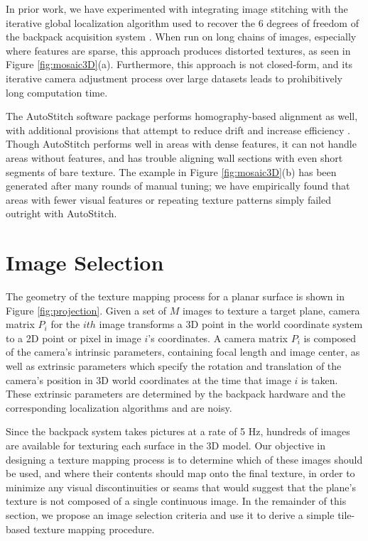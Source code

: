 \documentclass[]{spie}  %
\begin{document}
In prior work, we have experimented with integrating image stitching
with the iterative global localization algorithm used to recover the 6
degrees of freedom of the backpack acquisition system
\cite{liu2010indoor}. When run on long chains of images, especially
where features are sparse, this approach produces distorted textures,
as seen in Figure \ref{fig:mosaic3D}(a). Furthermore, this approach is
not closed-form, and its iterative camera adjustment process over
large datasets leads to prohibitively long computation time.

The AutoStitch software package performs homography-based alignment as
well, with additional provisions that attempt to reduce drift and
increase efficiency \cite{panorama2d, autostitch}. Though AutoStitch
performs well in areas with dense features, it can not handle areas
without features, and has trouble aligning wall sections with even
short segments of bare texture. The example in Figure
\ref{fig:mosaic3D}(b) has been generated after many rounds of manual
tuning; we have empirically found that areas with fewer visual
features or repeating texture patterns simply failed outright with
AutoStitch.

\section{Image Selection}
\label{sec:simpleTextureMapping}

The geometry of the texture mapping process for a planar surface is
shown in Figure \ref{fig:projection}. Given a set of $M$ images to
texture a target plane, camera matrix $P_i$ for the $ith$ image
transforms a 3D point in the world coordinate system to a 2D point or
pixel in image $i$'s coordinates. A camera matrix $P_i$ is composed of
the camera's intrinsic parameters, containing focal length and image
center, as well as extrinsic parameters which specify the rotation and
translation of the camera's position in 3D world coordinates at the
time that image $i$ is taken. These extrinsic parameters are
determined by the backpack hardware and the corresponding localization
algorithms \cite{chen2010indoor, liu2010indoor, kua2012loopclosure}
and are noisy.

Since the backpack system takes pictures at a rate of 5 Hz, hundreds
of images are available for texturing each surface in the 3D
model. Our objective in designing a texture mapping process is to
determine which of these images should be used, and where their
contents should map onto the final texture, in order to minimize any
visual discontinuities or seams that would suggest that the plane's
texture is not composed of a single continuous image. In the remainder
of this section, we propose an image selection criteria and use it to
derive a simple tile-based texture mapping procedure.
\end{document}
